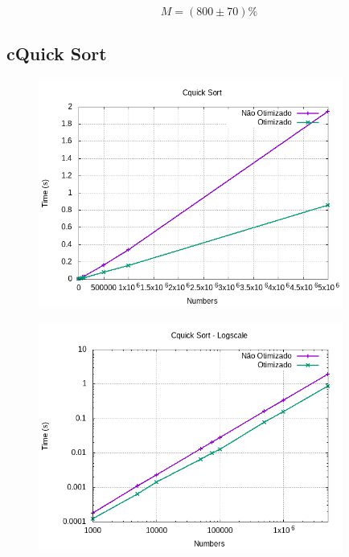 \documentclass[a4paper, 12pt]{article}
\begin{document}
\begin{equation*}
M = (800  \pm 70) \%
\end{equation*}


\subsection{cQuick Sort}
\begin{figure}[H]
	\centering
	\includegraphics[width=10.0cm]{cquick.png}
\end{figure}



\begin{figure}[H]
	\centering
	\includegraphics[width=10.0cm]{cquick_log.png}
\end{figure}
\end{document}
